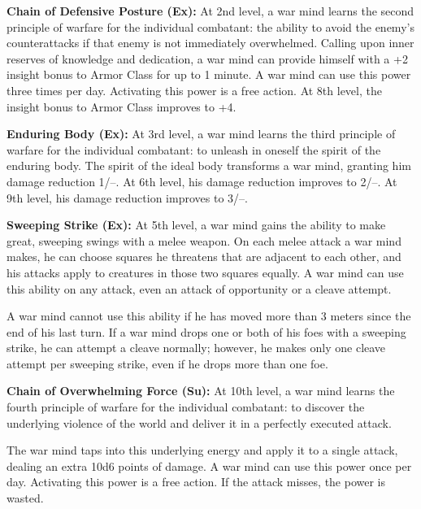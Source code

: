 {\textbf{Chain of Defensive Posture (Ex):} At 2nd level, a war mind learns the second principle of warfare for the individual combatant: the ability to avoid the enemy's counterattacks if that enemy is not immediately overwhelmed. Calling upon inner reserves of knowledge and dedication, a war mind can provide himself with a +2 insight bonus to Armor Class for up to 1 minute. A war mind can use this power three times per day. Activating this power is a free action. At 8th level, the insight bonus to Armor Class improves to +4.

\textbf{Enduring Body (Ex):} At 3rd level, a war mind learns the third principle of warfare for the individual combatant: to unleash in oneself the spirit of the enduring body. The spirit of the ideal body transforms a war mind, granting him damage reduction 1/--. At 6th level, his damage reduction improves to 2/--. At 9th level, his damage reduction improves to 3/--.

\textbf{Sweeping Strike (Ex):} At 5th level, a war mind gains the ability to make great, sweeping swings with a melee weapon. On each melee attack a war mind makes, he can choose squares he threatens that are adjacent to each other, and his attacks apply to creatures in those two squares equally. A war mind can use this ability on any attack, even an attack of opportunity or a cleave attempt.

A war mind cannot use this ability if he has moved more than 3 meters since the end of his last turn. If a war mind drops one or both of his foes with a sweeping strike, he can attempt a cleave normally; however, he makes only one cleave attempt per sweeping strike, even if he drops more than one foe.

\textbf{Chain of Overwhelming Force (Su):} At 10th level, a war mind learns the fourth principle of warfare for the individual combatant: to discover the underlying violence of the world and deliver it in a perfectly executed attack.

The war mind taps into this underlying energy and apply it to a single attack, dealing an extra 10d6 points of damage. A war mind can use this power once per day. Activating this power is a free action. If the attack misses, the power is wasted.
}
